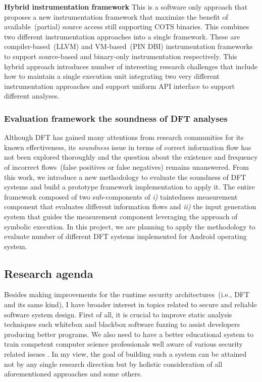 \documentclass[letterpaper, 10pt]{article}
\begin{document}
\begin{small}
{\bf Hybrid instrumentation framework} This is a software only approach that
proposes a new instrumentation framework that maximize the benefit of
available~(partial) source access still supporting COTS binaries.
%
This combines two different instrumentation approaches into a single framework.
These are compiler-based~(LLVM) and VM-based~(PIN DBI) instrumentation
frameworks to support source-based and binary-only instrumentation respectively.
%
This hybrid approach introduces number of interesting research challenges that
include how to maintain a single execution unit integrating two very different
instrumentation approaches and support uniform API interface to support
different analyses.
%

\subsubsection*{Evaluation framework the soundness of DFT analyses}
%
Although DFT has gained many attentions from research communities for its known
effectiveness, its {\it soundness} issue in terms of correct information flow
has not been explored thoroughly and the question about the existence and
frequency of incorrect flows~(false positives or false negatives) remains
unanswered. From this work, we introduce a new methodology to evaluate the
soundness of DFT systems and build a prototype framework implementation to
apply it.
%
The entire framework composed of two sub-components of {\it i)} taintedness
measurement component that evaluates different information flows and {\it ii)}
the input generation system that guides the measurement component leveraging
the approach of symbolic execution.
%
In this project, we are planning to apply the methodology to evaluate number of
different DFT systems implemented for Android operating system.

%
%
\subsection*{Research agenda}
%
Besides making improvements for the runtime security architectures~(i.e., DFT
and its same kind), I have broader interest in topics related to secure and
reliable software system design.
%
First of all, it is crucial to improve static analysis techniques such whitebox
and blackbox software fuzzing to assist developers producing better programs. 
%
We also need to have a better educational system to train competent computer
science professionals well aware of various security related issues .
%
In my view, the goal of building such a system can be attained not by any
single research direction but by holistic consideration of all aforementioned
approaches and some others.


\end{small}
\end{document}
